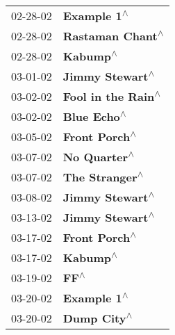 \begin{supertabular}{p{0.25\columnwidth}p{0.75\columnwidth}}
 02-28-02 &                                                                \textbf{Example 1\textsuperscript{$\wedge$}} \\
 02-28-02 &                                                           \textbf{Rastaman Chant\textsuperscript{$\wedge$}} \\
 02-28-02 &                                                                   \textbf{Kabump\textsuperscript{$\wedge$}} \\
 03-01-02 &                                                            \textbf{Jimmy Stewart\textsuperscript{$\wedge$}} \\
 03-02-02 &                                                         \textbf{Fool in the Rain\textsuperscript{$\wedge$}} \\
 03-02-02 &                                                                \textbf{Blue Echo\textsuperscript{$\wedge$}} \\
 03-05-02 &                                                              \textbf{Front Porch\textsuperscript{$\wedge$}} \\
 03-07-02 &                                                               \textbf{No Quarter\textsuperscript{$\wedge$}} \\
 03-07-02 &                                                             \textbf{The Stranger\textsuperscript{$\wedge$}} \\
 03-08-02 &                                                            \textbf{Jimmy Stewart\textsuperscript{$\wedge$}} \\
 03-13-02 &                                                            \textbf{Jimmy Stewart\textsuperscript{$\wedge$}} \\
 03-17-02 &                                                              \textbf{Front Porch\textsuperscript{$\wedge$}} \\
 03-17-02 &                                                                   \textbf{Kabump\textsuperscript{$\wedge$}} \\
 03-19-02 &                                                                       \textbf{FF\textsuperscript{$\wedge$}} \\
 03-20-02 &                                                                \textbf{Example 1\textsuperscript{$\wedge$}} \\
 03-20-02 &                                                                \textbf{Dump City\textsuperscript{$\wedge$}} \\

\end{supertabular}
